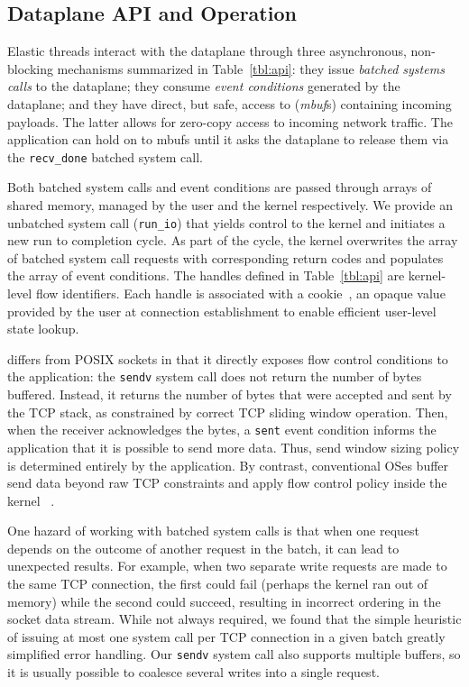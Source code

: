 \subsection{Dataplane API and Operation}
\label{sec:impl:api}

Elastic threads interact with the \ix dataplane through three
asynchronous, non-blocking mechanisms summarized in
Table~\ref{tbl:api}: they issue \emph{batched systems calls} to the
dataplane; they consume \emph{event conditions} generated by the
dataplane; and they have direct, but safe, access to
(\emph{mbuf}s) containing incoming payloads.  The latter allows
for zero-copy access to incoming network traffic.  The application
can hold on to mbufs until it asks the dataplane to
release them via the \texttt{recv\_done} batched system call.

Both batched system calls and event conditions are passed through
arrays of shared memory, managed by the user and the kernel
respectively.  We provide an unbatched system call
(\texttt{run\_io}) that yields control to the kernel and initiates a new run
to completion cycle. As part of the
cycle, the kernel overwrites the array of batched system call requests with
corresponding return codes and populates the array of event conditions.
The handles defined in Table~\ref{tbl:api} are kernel-level flow identifiers. Each handle is
associated with a cookie~\cite{DBLP:conf/osdi/HanMCR12}, an opaque value
provided by the user at connection establishment to enable efficient
user-level state lookup. %

\ix differs from POSIX sockets in that it directly exposes flow
control conditions to the application: the \texttt{sendv} system call
does not return the number of bytes buffered. Instead, it returns the
number of bytes that were accepted and sent by the TCP stack, as
constrained by correct TCP sliding window operation. Then, when the
receiver acknowledges the bytes, a \texttt{sent} event
condition informs the application that it is possible to send more
data. Thus, send window sizing policy is determined entirely by the
application.  By contrast, conventional OSes buffer send data beyond
raw TCP constraints and apply flow control policy inside the kernel
~\cite{dynamicwindow}.

One hazard of working with batched system calls is that when one
request depends on the outcome of another request in the batch, it can
lead to unexpected results. For example, when two separate write requests
are made to the same TCP connection, the first could fail (perhaps the
kernel ran out of memory) while the second could succeed, resulting in incorrect
ordering in the socket data stream. While not always required, we found that the
simple heuristic of issuing at most one system call per TCP connection in a given
batch greatly simplified error handling. Our \texttt{sendv} system
call also supports multiple buffers, so it is
usually possible to coalesce several writes into a single request.

